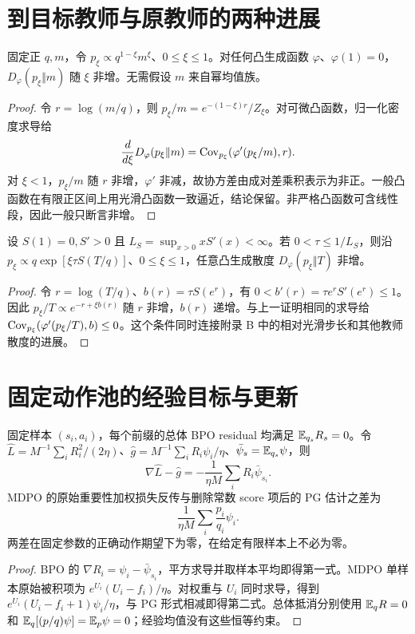 \section{到目标教师与原教师的两种进展}
\begin{theorem}[任意冻结目标的全凸散度拟合进展]
\label{thm:any-target-progress}
固定正 $q,m$，令 $p_\xi\propto q^{1-\xi}m^\xi$、$0\le\xi\le1$。对任何凸生成函数 $\varphi$、$\varphi(1)=0$，$D_\varphi(p_\xi\Vert m)$ 随 $\xi$ 非增。无需假设 $m$ 来自幂均值族。
\end{theorem}
\begin{proof}
令 $r=\log(m/q)$，则 $p_\xi/m=e^{-(1-\xi)r}/Z_\xi$。对可微凸函数，归一化密度求导给
\begin{equation}
\frac d{d\xi}D_\varphi(p_\xi\Vert m)
=\operatorname{Cov}_{p_\xi}(\varphi'(p_\xi/m),r).
\end{equation}
对 $\xi<1$，$p_\xi/m$ 随 $r$ 非增，$\varphi'$ 非减，故协方差由成对差乘积表示为非正。一般凸函数在有限正区间上用光滑凸函数一致逼近，结论保留。非严格凸函数可含线性段，因此一般只断言非增。
\end{proof}

\begin{corollary}[一般单调信号的教师散度进展]
\label{cor:general-signal-progress}
设 $S(1)=0,S'>0$ 且 $L_S=\sup_{x>0}xS'(x)<\infty$。若 $0<\tau\le1/L_S$，则沿 $p_\xi\propto q\exp[\xi\tau S(T/q)]$、$0\le\xi\le1$，任意凸生成散度 $D_\varphi(p_\xi\Vert T)$ 非增。
\end{corollary}
\begin{proof}
令 $r=\log(T/q)$、$b(r)=\tau S(e^r)$，有 $0<b'(r)=\tau e^rS'(e^r)\le1$。因此 $p_\xi/T\propto e^{-r+\xi b(r)}$ 随 $r$ 非增，$b(r)$ 递增。与上一证明相同的求导给 $\operatorname{Cov}_{p_\xi}(\varphi'(p_\xi/T),b)\le0$。这个条件同时连接附录 B 中的相对光滑步长和其他教师散度的进展。
\end{proof}

\section{固定动作池的经验目标与更新}
\begin{proposition}[精确中心也不消除经验梯度差]
\label{prop:empirical-score-gap}
固定样本 $(s_i,a_i)$，每个前缀的总体 BPO residual 均满足 $\mathbb E_{q_s}R_s=0$。令 $\widehat L=M^{-1}\sum_iR_i^2/(2\eta)$、$\widehat g=M^{-1}\sum_iR_i\psi_i/\eta$、$\bar\psi_s=\mathbb E_{q_s}\psi$，则
\begin{equation}
\nabla\widehat L-\widehat g
=-\frac1{\eta M}\sum_iR_i\bar\psi_{s_i}.
\end{equation}
MDPO 的原始重要性加权损失反传与删除常数 score 项后的 PG 估计之差为
\begin{equation}
\frac1{\eta M}\sum_i\frac{p_i}{q_i}\psi_i.
\end{equation}
两差在固定参数的正确动作期望下为零，在给定有限样本上不必为零。
\end{proposition}
\begin{proof}
BPO 的 $\nabla R_i=\psi_i-\bar\psi_{s_i}$，平方求导并取样本平均即得第一式。MDPO 单样本原始被积项为 $e^{U_i}(U_i-f_i)/\eta$。对权重与 $U_i$ 同时求导，得到 $e^{U_i}(U_i-f_i+1)\psi_i/\eta$，与 PG 形式相减即得第二式。总体抵消分别使用 $\mathbb E_qR=0$ 和 $\mathbb E_q[(p/q)\psi]=\mathbb E_p\psi=0$；经验均值没有这些恒等约束。
\end{proof}

